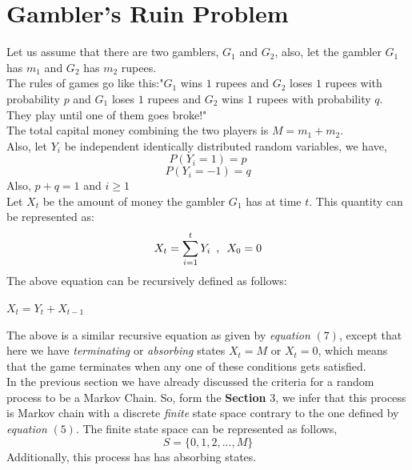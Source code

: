 \documentclass[12pt,a4paper]{article}%
\begin{document}
 	\section{Gambler's Ruin Problem}
 	\begin{flushleft}
 		Let us assume that there are two gamblers, $G_1$ and $G_2$, also, let the gambler $G_1$ has $m_1$ and $G_2$ has $m_2$ rupees.\\\bigskip
 		The rules of games go like this:"$G_1$ wins $1$ rupees and $G_2$ loses $1$ rupees with probability $p$ and $G_1$ loses $1$ rupees and $G_2$ wins $1$ rupees with probability $q$. They play until one of them goes broke!"\\\bigskip
 		The total capital money combining the two players is $M=m_1+m_2$.\\\bigskip
 		Also, let $Y_{i}$ be independent identically distributed random variables, we have,
 		\begin{equation}
 		P(Y_{i}=1) = p
 		\end{equation}
 		\begin{equation}
 		P(Y_{i}=-1) = q 
 		\end{equation}
 		Also, $p+q=1$ and $i \geq 1$\\\bigskip
 		Let $X_{t}$ be the amount of money the gambler $G_1$ has at time $t$. This quantity can be represented as:
 		\begin{equation}
 		X_{t} = \sum_{\mathclap{i=1}}^{t} Y_{i}\enspace , \enspace X_{0}=0
 		\end{equation}
 		The above equation can be recursively defined as follows:
 		\begin{center}
 			$ X_{t}=Y_{t}+X_{t-1}$
 		\end{center}
 		The above is a similar recursive equation as given by \textit{equation} $(7)$, except that 
 		here we have \textit{terminating} or \textit{absorbing} states $X_t=M$ or $X_t=0$, which means that the game terminates when any one of these conditions gets satisfied.\\\bigskip
 		In the previous section we have already discussed the criteria for a random process to be a Markov Chain. So, form the \textbf{Section} 3, we infer that this process is Markov chain with a discrete \textit{finite} state space contrary to the one defined by \textit{equation} $(5)$. The finite state space can be represented as follows,
 		\begin{equation}
 			S=\{0,1,2,...,M\}
 		\end{equation}
 		Additionally, this process has has absorbing states.\\\bigskip

\end{flushleft}
\end{document}
